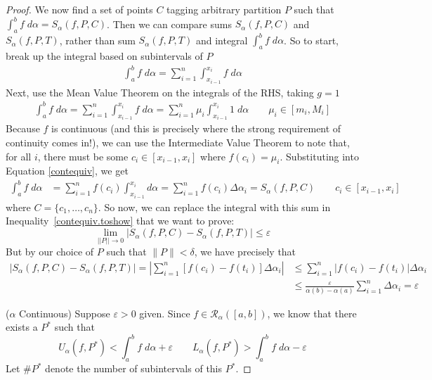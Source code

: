 \documentclass[12pt]{book}
\numberwithin{equation}{section} %
\theoremstyle{plain}
\theoremstyle{definition}
\theoremstyle{remark}
\begin{document}
\begin{proof}
We now find a set of points $C$ tagging arbitrary partition $P$
such that $\int^b_a f\;d\alpha = S_\alpha(f,P,C)$. Then we can compare
sums $S_\alpha(f,P,C)$ and $S_\alpha(f,P,T)$, rather
than sum $S_\alpha(f,P,T)$ and integral $\int^b_af\;d\alpha$.  So to
start, break up the integral based on subintervals of $P$
\begin{align*}
  \int^b_a f \; d\alpha
  =
  \sum_{i=1}^n \int^{x_i}_{x_{i-1}} f\;d\alpha
\end{align*}
Next, use the Mean Value Theorem on the integrals of the RHS, taking
$g=1$
\begin{align}
  \int^b_a f \; d\alpha
  =
  \sum_{i=1}^n \int^{x_i}_{x_{i-1}} f\;d\alpha
  =
  \sum_{i=1}^n \mu_i\int^{x_i}_{x_{i-1}} 1\;d\alpha
  \qquad \mu_i \in [m_i,M_i]
  \label{contequiv}
\end{align}
Because $f$ is continuous (and this is precisely where the strong
requirement of continuity comes in!),
we can use the Intermediate Value Theorem to note that, for all $i$,
there must be some $c_i \in [x_{i-1}, x_i]$ where $f(c_i) = \mu_i$.
Substituting into Equation \ref{contequiv}, we get
\begin{align*}
  \int^b_a f \; d\alpha
    &= \sum^n_{i=1} f(c_i) \int^{x_i}_{x_{i-1}} d\alpha
    = \sum^n_{i=1} f(c_i) \Delta\alpha_i
    = S_\alpha(f,P,C)
    \qquad
    c_i \in [x_{i-1}, x_{i}]
\end{align*}
where $C=\{c_1,\ldots,c_n\}$.
So now, we can replace the integral with this sum in
Inequality~\ref{contequiv.toshow} that we want to prove:
\begin{equation}
    \label{contequiv.toshow2}
    \lim_{||P||\rightarrow 0}
    \left\lvert  S_\alpha(f,P,C)- S_\alpha(f,P,T) \right\rvert
        \leq \varepsilon
\end{equation}
But by our choice of $P$ such that $\lVert P\rVert<\delta$, we have
precisely that
\begin{align*}
    \left\lvert  S_\alpha(f,P,C)- S_\alpha(f,P,T) \right\rvert
    = \left\lvert  \sum^n_{i=1} \left[f(c_i) - f(t_i) \right]
    \Delta\alpha_i\right\rvert
    &\leq \sum^n_{i=1} \left\lvert  f(c_i) - f(t_i) \right\rvert
    \Delta\alpha_i  \\
    &\leq \frac{\varepsilon}{\alpha(b)-\alpha(a)}
        \sum^n_{i=1} \Delta\alpha_i =  \varepsilon
\end{align*}
\clearpage

($\alpha$ Continuous)
Suppose $\varepsilon>0$ given.  Since $f\in\mathscr{R}_\alpha([a,b])$,
we know that there exists a $P^*$ such that
\begin{equation}
    \label{bases}
    U_\alpha(f,P^*) < \int^b_a f\;d\alpha + \varepsilon
        \qquad L_\alpha(f,P^*) > \int^b_a f\;d\alpha - \varepsilon
\end{equation}
Let $\#P^*$ denote the number of subintervals of this $P^*$.


\end{proof}
\end{document}
